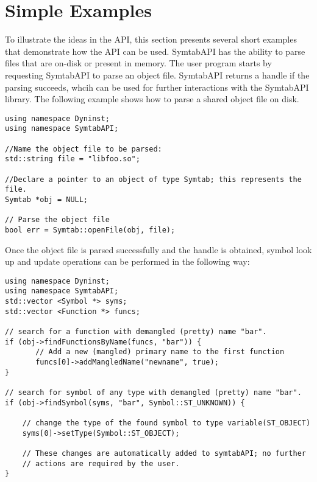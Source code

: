 \section{Simple Examples}

To illustrate the ideas in the API, this section presents several short examples
that demonstrate how the API can be used.  SymtabAPI has the ability to parse
files that are on-disk or present in memory. The user program starts by
requesting SymtabAPI to parse an object file. SymtabAPI returns a handle if the
parsing succeeds, whcih can be used for further interactions with the SymtabAPI
library. The following example shows how to parse a shared object file on disk.

\lstset{numbers=left, numberstyle=\tiny, stepnumber=5, numbersep=5pt}
\begin{lstlisting}
using namespace Dyninst;
using namespace SymtabAPI;

//Name the object file to be parsed:
std::string file = "libfoo.so";

//Declare a pointer to an object of type Symtab; this represents the file.
Symtab *obj = NULL;

// Parse the object file
bool err = Symtab::openFile(obj, file);
\end{lstlisting}

Once the object file is parsed successfully and the handle is obtained, symbol look up and update operations can be performed in the following way:

\begin{lstlisting}
using namespace Dyninst;
using namespace SymtabAPI;
std::vector <Symbol *> syms;
std::vector <Function *> funcs;

// search for a function with demangled (pretty) name "bar".
if (obj->findFunctionsByName(funcs, "bar")) {
       // Add a new (mangled) primary name to the first function
       funcs[0]->addMangledName("newname", true);
}

// search for symbol of any type with demangled (pretty) name "bar".
if (obj->findSymbol(syms, "bar", Symbol::ST_UNKNOWN)) { 

    // change the type of the found symbol to type variable(ST_OBJECT)
    syms[0]->setType(Symbol::ST_OBJECT);

    // These changes are automatically added to symtabAPI; no further
    // actions are required by the user.
}
\end{lstlisting}

